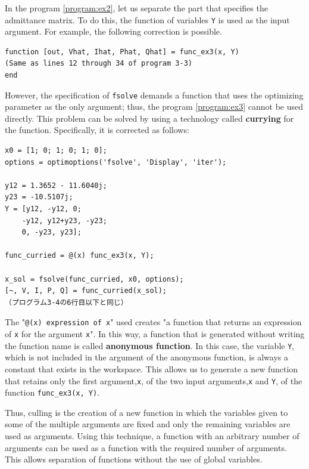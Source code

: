 \documentclass[graybox, envcountchap]{svmult}
\begin{document}
\begin{example}
In the program \nobreak\ref{program:ex2}, let us separate the part that specifies the admittance matrix.
To do this, the function of variables \verb|Y| is used as the input argument.
For example, the following correction is possible.

\smallskip
\begin{PROGRAMA}[count, title={func\_ex3.m}]\label{program:ex3}
\begin{verbatim}
function [out, Vhat, Ihat, Phat, Qhat] = func_ex3(x, Y)
(Same as lines 12 through 34 of program 3-3)
end
\end{verbatim}
\end{PROGRAMA}

However, the specification of \verb|fsolve| demands a function that uses the optimizing parameter as the only argument; thus, the program \ref{program:ex3} cannot be used directly.
This problem can be solved by using a technology called \textbf{currying} for the function.
Specifically, it is corrected as follows:

\smallskip
\begin{PROGRAMA}[count,title={main\_ex3.m}]\label{program:ex3_main}
\begin{verbatim}
x0 = [1; 0; 1; 0; 1; 0];
options = optimoptions('fsolve', 'Display', 'iter');

y12 = 1.3652 - 11.6040j;
y23 = -10.5107j;
Y = [y12, -y12, 0;
    -y12, y12+y23, -y23;
    0, -y23, y23];

func_curried = @(x) func_ex3(x, Y);

x_sol = fsolve(func_curried, x0, options);
[~, V, I, P, Q] = func_curried(x_sol);
（プログラム3-4の6行目以下と同じ）
\end{verbatim}
\end{PROGRAMA}

The "\verb|@(x) expression of x|" used creates "a function that returns an expression of \verb|x| for the argument \verb|x|".
In this way, a function that is generated without writing the function name is called \textbf{anonymous function}.
In this case, the variable \verb|Y|, which is not included in the argument of the anonymous function, is always a constant that exists in the workspace.
This allows us to generate a new function that retains only the first argument,\verb|x|, of the two input arguments,\verb|x| and \verb|Y|, of the function \verb|func_ex3(x, Y)|.


Thus, culling is the creation of a new function in which the variables given to some of the multiple arguments are fixed and only the remaining variables are used as arguments.
Using this technique, a function with an arbitrary number of arguments can be used as a function with the required number of arguments.
This allows separation of functions without the use of global variables.

\end{example}
\end{document}
